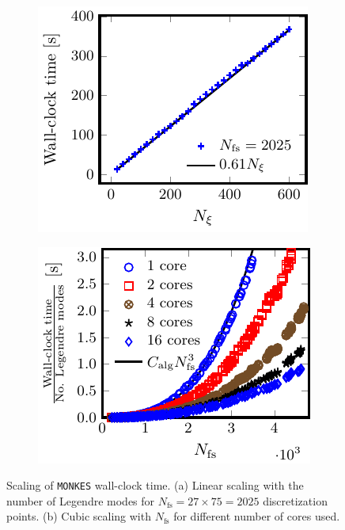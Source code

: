 \documentclass[10pt]{iopart}
\newcommand{\MONKES}{{\texttt{MONKES}}}
\begin{document}
\begin{figure}[h]
	\centering
	\begin{subfigure}[t]{0.35\textwidth}
		\includegraphics{MONKES-Scaling-Legendre} 
%		
		\caption{}
		\label{subfig:MONKES_Scaling_Legendre}
	\end{subfigure}    
	\begin{subfigure}[t]{0.35\textwidth}
		\includegraphics{MONKES-Scaling-Flux-Surface}
%		
		\caption{}
		\label{subfig:MONKES_Scaling_Nfs}
	\end{subfigure}
	\caption{Scaling of {\MONKES} wall-clock time. (a) Linear scaling with the number of Legendre modes for $N_{\text{fs}}=27\times 75 = 2025$ discretization points. (b) Cubic scaling with $N_{\text{fs}}$ for different number of cores used.}
	\label{fig:MONKES_Scaling}
\end{figure}
\end{document}
